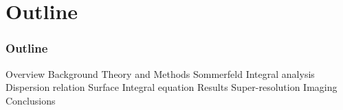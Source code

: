 \documentclass[mathserif,16pt,xcolor=table]{beamer}
\begin{document}
\section{Outline}
\begin{frame}
  \frametitle{Outline}
  \begin{outline}[itemize]
    \1 Overview
    \1 Background
    \1 Theory and Methods
    \2 Sommerfeld Integral analysis
    \2 Dispersion relation
    \2 Surface Integral equation
    \1 Results
    \2 Super-resolution Imaging
    \1 Conclusions
  \end{outline}
\end{frame}
\end{document}
